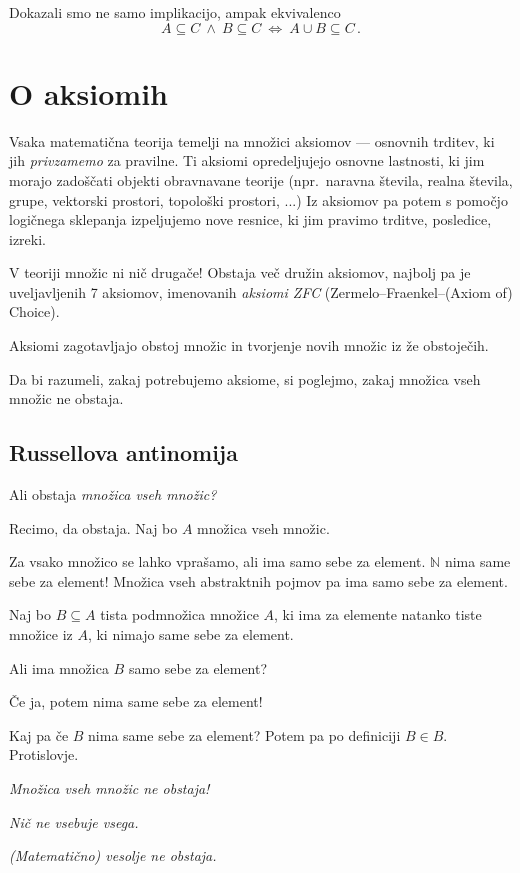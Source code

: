 \documentclass[11pt,paper=b5,footinclude,headinclude]{scrbook} %
\def\inn {{~\wedge~}}
\def\cee {{~\Leftrightarrow~}}
\begin{document}
Dokazali smo ne samo implikacijo, ampak ekvivalenco
$$A\subseteq C\inn B\subseteq C\cee A\cup B \subseteq C\,.$$


\section{O aksiomih}

Vsaka matematična teorija temelji na množici aksiomov --- osnovnih trditev, ki jih {\em privzamemo} za pravilne. Ti aksiomi opredeljujejo osnovne lastnosti, ki jim morajo zadoščati objekti obravnavane teorije (npr.~naravna števila, realna števila, grupe, vektorski prostori, topološki prostori, ...) Iz aksiomov pa potem s pomočjo logičnega sklepanja izpeljujemo nove resnice, ki jim pravimo trditve, posledice, izreki.

V teoriji množic ni nič drugače! Obstaja več družin aksiomov, najbolj pa je uveljavljenih 7 aksiomov, imenovanih {\em aksiomi ZFC} (Zermelo--Fraenkel--(Axiom of) Choice).

Aksiomi zagotavljajo obstoj množic in tvorjenje novih množic iz že obstoječih.

Da bi razumeli, zakaj potrebujemo aksiome, si poglejmo, zakaj množica vseh
množic ne obstaja.

\subsection{Russellova antinomija}

Ali obstaja {\em množica vseh množic?}

Recimo, da obstaja. Naj bo $A$ množica vseh množic.

Za vsako množico se lahko vprašamo, ali ima samo sebe za element. $\mathbb{N}$ nima same sebe za element! Množica vseh abstraktnih pojmov pa ima samo sebe za element.

Naj bo $B\subseteq A$ tista podmnožica množice $A$, ki ima za elemente natanko tiste množice iz $A$, ki nimajo same sebe za element.

Ali ima množica $B$ samo sebe za element?

Če ja, potem nima same sebe za element!

Kaj pa če $B$ nima same sebe za element? Potem pa po definiciji $B\in B$.
Protislovje.

{\em Množica vseh množic ne obstaja!}

{\centerline\em Nič ne vsebuje vsega.} \textit{(Matematično) vesolje ne obstaja.}
\end{document}
